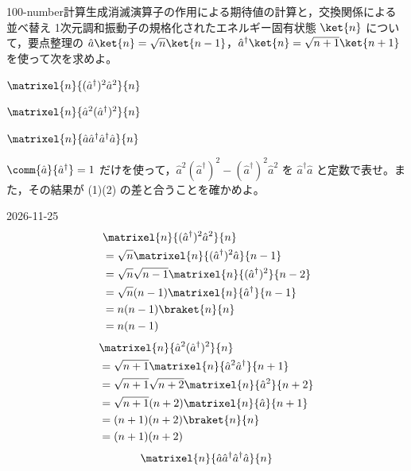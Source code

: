 \documentclass[uplatex,dvipdfmx,a4paper,11pt]{jsarticle}
\begin{document}
\begin{mondai}{100-number}{計算}{生成消滅演算子の作用による期待値の計算と，交換関係による並べ替え}
  1次元調和振動子の規格化されたエネルギー固有状態 $\ket{n}$ について，要点整理の $\hat{a}\ket{n}=\sqrt{n}\ket{n-1}$，$\hat{a}^{\dagger}\ket{n}=\sqrt{n+1}\ket{n+1}$ を使って次を求めよ。
  \begin{shoumon}
    \item $\matrixel{n}{(\hat{a}^{\dagger})^{2}\hat{a}^{2}}{n}$
    \item $\matrixel{n}{\hat{a}^{2}(\hat{a}^{\dagger})^{2}}{n}$
    \item $\matrixel{n}{\hat{a}\hat{a}^{\dagger}\hat{a}^{\dagger}\hat{a}}{n}$
    \item $\comm{\hat{a}}{\hat{a}^{\dagger}}=1$ だけを使って，$\hat{a}^{2}(\hat{a}^{\dagger})^{2}-(\hat{a}^{\dagger})^{2}\hat{a}^{2}$ を $\hat{a}^{\dagger}\hat{a}$ と定数で表せ。また，その結果が (1)(2) の差と合うことを確かめよ。
  \end{shoumon}
\begin{kotaeutsushi}{2026-11-25}
\begin{align*}
&\matrixel{n}{(\hat{a}^{\dagger})^{2}\hat{a}^{2}}{n}\\
&=\sqrt{n}\matrixel{n}{(\hat{a}^{\dagger})^{2}\hat{a}}{n-1}\\
&=\sqrt{n}\sqrt{n-1}\matrixel{n}{(\hat{a}^{\dagger})^{2}}{n-2}\\
&=\sqrt{n}(n-1)\matrixel{n}{\hat{a}^{\dagger}}{n-1}\\
&=n(n-1)\braket{n}{n}\\
&=n(n-1)
\end{align*}
\begin{align*}
&\matrixel{n}{\hat{a}^{2}(\hat{a}^{\dagger})^{2}}{n}\\
&=\sqrt{n+1}\matrixel{n}{\hat{a}^{2}\hat{a}^{\dagger}}{n+1}\\
&=\sqrt{n+1}\sqrt{n+2}\matrixel{n}{\hat{a}^{2}}{n+2}\\
&=\sqrt{n+1}(n+2)\matrixel{n}{\hat{a}}{n+1}\\
&=(n+1)(n+2)\braket{n}{n}\\
&=(n+1)(n+2)
\end{align*}
\begin{align*}
&\matrixel{n}{\hat{a}\hat{a}^{\dagger}\hat{a}^{\dagger}\hat{a}}{n}\\

\end{align*}
\end{kotaeutsushi}
\end{mondai}
\end{document}
